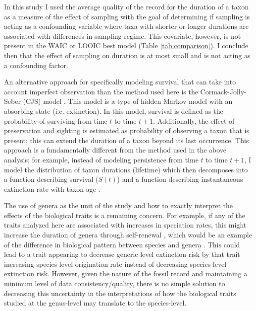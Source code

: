 \documentclass{article}
\begin{document}
In this study I used the average quality of the record for the duration of a taxon as a measure of the effect of sampling with the goal of determining if sampling is acting as a confounding variable where taxa with shorter or longer durations are associated with differences in sampling regime. This covariate, however, is not present in the WAIC or LOOIC best model (Table \ref{tab:comparison}). I conclude then that the effect of sampling on duration is at most small and is not acting as a confounding factor.

An alternative approach for specifically modeling survival that can take into account imperfect observation than the method used here is the Cormack-Jolly-Seber (CJS) model \citep{Royle2008,Liow2008,Tomiya2013,Liow2010b}. This model is a type of hidden Markov model with an absorbing state (i.e. extinction). In this model, survival is defined as the probability of surviving from time \(t\) to time \(t + 1\). Additionally, the effect of preservation and sighting is estimated as probability of observing a taxon that is present; this can extend the duration of a taxon beyond its last occurrence. This approach is a fundamentally different from the method used in the above analysis; for example, instead of modeling persistence from time \(t\) to time \(t + 1\), I model the distribution of taxon durations (lifetime) which then decomposes into a function describing survival (\(S(t)\)) and a function describing instantaneous extinction rate with taxon age \citep{Klein2003,Royle2008}. 


The use of genera as the unit of the study and how to exactly interpret the effects of the biological traits is a remaining concern. For example, if any of the traits analyzed here are associated with increases in speciation rates, this might increase the duration of genera through self-renewal \citep{Raup1991b,Raup1994}, which would be an example of the difference in biological pattern between species and genera \citep{Jablonski1987,Jablonski2007,Jablonski2008a}. This could lead to a trait appearing to decrease generic level extinction risk by that trait increasing species level origination rate instead of decreasing species level extinction risk. However, given the nature of the fossil record and maintaining a minimum level of data consistency/quality, there is no simple solution to decreasing this uncertainty in the interpretations of how the biological traits studied at the genus-level may translate to the species-level.
\end{document}

